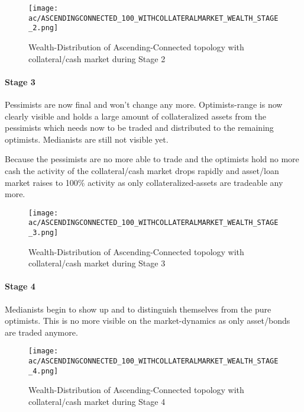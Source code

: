 \documentclass[Bachelorarbeit.tex]{subfiles}
\begin{document}
\begin{figure}[H]
	\centering
  \texttt{[image: ac/ASCENDINGCONNECTED\_100\_WITHCOLLATERALMARKET\_WEALTH\_STAGE\_2.png]}
  	\caption{Wealth-Distribution of Ascending-Connected topology with collateral/cash market during Stage 2}
	\label{fig:wealth_ASCENDINGCONNECTED_100_WITHCOLLATERALMARKET_WEALTH_STAGE_2}
\end{figure}

\paragraph{Stage 3}
Pessimists are now final and won't change any more. Optimists-range is now clearly visible and holds a large amount of collateralized assets from the pessimists which needs now to be traded and distributed to the remaining optimists. Medianists are still not visible yet.

\medskip

Because the pessimists are no more able to trade and the optimists hold no more cash the activity of the collateral/cash market drops rapidly and asset/loan market raises to 100\% activity as only collateralized-assets are tradeable any more.
		
\begin{figure}[H]
	\centering
  \texttt{[image: ac/ASCENDINGCONNECTED\_100\_WITHCOLLATERALMARKET\_WEALTH\_STAGE\_3.png]}
  	\caption{Wealth-Distribution of Ascending-Connected topology with collateral/cash market during Stage 3}
	\label{fig:wealth_ASCENDINGCONNECTED_100_WITHCOLLATERALMARKET_WEALTH_STAGE_3}
\end{figure}

\paragraph{Stage 4}
Medianists begin to show up and to distinguish themselves from the pure optimists. This is no more visible on the market-dynamics as only asset/bonds are traded anymore.
		
\begin{figure}[H]
	\centering
  \texttt{[image: ac/ASCENDINGCONNECTED\_100\_WITHCOLLATERALMARKET\_WEALTH\_STAGE\_4.png]}
  	\caption{Wealth-Distribution of Ascending-Connected topology with collateral/cash market during Stage 4}
	\label{fig:wealth_ASCENDINGCONNECTED_100_WITHCOLLATERALMARKET_WEALTH_STAGE_4}
\end{figure}
\end{document}
